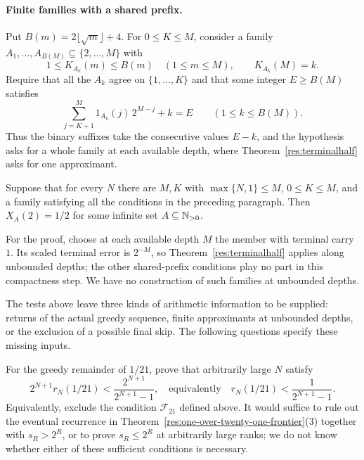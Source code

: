 \documentclass[11pt]{article}
\begin{document}
\paragraph{Finite families with a shared prefix.}
Put $B(m)=2\lfloor\sqrt m\rfloor+4$.  For $0\le K\le M$, consider a
family $A_1,\ldots,A_{B(M)}\subseteq\{2,\ldots,M\}$ with
\[
 1\le K_{A_k}(m)\le B(m)\quad(1\le m\le M),
 \qquad K_{A_k}(M)=k.
\]
Require that all the $A_k$ agree on $\{1,\ldots,K\}$ and that some
integer $E\ge B(M)$ satisfies
\[
 \sum_{j=K+1}^{M}1_{A_k}(j)\,2^{M-j}+k=E
 \qquad(1\le k\le B(M)).
\]
Thus the binary suffixes take the consecutive values $E-k$, and the
hypothesis asks for a whole family at each available depth, where
Theorem~\ref{res:terminalhalf} asks for one approximant.

\begin{theorem}
\label{res:cylinderhalf}
Suppose that for every $N$ there are $M,K$ with
$\max\{N,1\}\le M$, $0\le K\le M$, and a family satisfying all the
conditions in the preceding paragraph.  Then $X_A(2)=1/2$ for some
infinite set $A\subseteq\mathbb{N}_{>0}$.
\end{theorem}

For the proof, choose at each available depth $M$ the member with
terminal carry $1$. Its scaled terminal error is $2^{-M}$, so
Theorem~\ref{res:terminalhalf} applies along unbounded depths; the
other shared-prefix conditions play no part in this compactness step.
We have no construction of such families at unbounded depths.

The tests above leave three kinds of arithmetic information to be
supplied: returns of the actual greedy sequence, finite approximants at
unbounded depths, or the exclusion of a possible final skip. The
following questions specify these missing inputs.

\begin{problem}
\label{prob:one-over-twenty-one-membership}
For the greedy remainder of $1/21$, prove that arbitrarily large $N$
satisfy
\[
 2^{N+1}r_N(1/21)<\frac{2^{N+1}}{2^{N+1}-1},
 \quad\text{equivalently}\quad
 r_N(1/21)<\frac1{2^{N+1}-1}.
\]
Equivalently, exclude the condition $\mathcal F_{21}$ defined above.
It would suffice to rule out the eventual recurrence in
Theorem~\ref{res:one-over-twenty-one-frontier}(3) together with
$s_R>2^R$, or to prove $s_R\le2^R$ at arbitrarily large ranks; we do
not know whether either of these sufficient conditions is necessary.
\end{problem}
\end{document}
